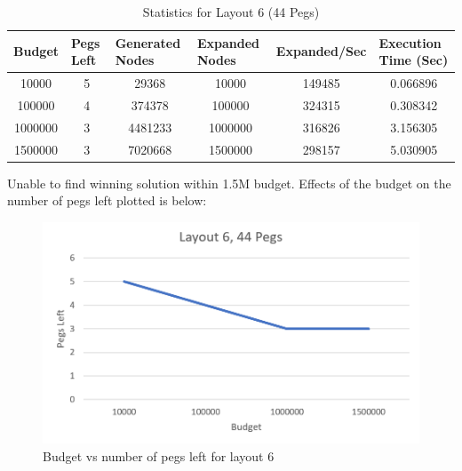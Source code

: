 \documentclass[12pt,a4paper]{article}
\begin{document}
\begin{table}[H]
\caption{Statistics for Layout 6 (44 Pegs)}
\label{tab:my-table}

\begin{tabular}{|c|c|c|c|c|c|}
\hline
Budget  & \multicolumn{1}{l|}{Pegs Left} & \multicolumn{1}{l|}{Generated Nodes} & \multicolumn{1}{l|}{Expanded Nodes} & \multicolumn{1}{l|}{Expanded/Sec} & \multicolumn{1}{l|}{Execution Time (Sec)} \\ \hline
10000   & 5                              & 29368                                & 10000                               & 149485                               & 0.066896                                              \\ \hline
100000  & 4                              & 374378                               & 100000                              & 324315                               & 0.308342                                              \\ \hline
1000000 & 3                              & 4481233                              & 1000000                             & 316826                               & 3.156305                                              \\ \hline
1500000 & 3                              & 7020668                              & 1500000                             & 298157                               & 5.030905                                              \\ \hline
\end{tabular}
\end{table}

Unable to find winning solution within 1.5M budget. Effects of the budget on the number of pegs left plotted is below:

\begin{figure}[H]
\centering
\includegraphics[scale=0.5]{layout6.png}
\caption{Budget vs number of pegs left for layout 6}
\end{figure}
\end{document}
